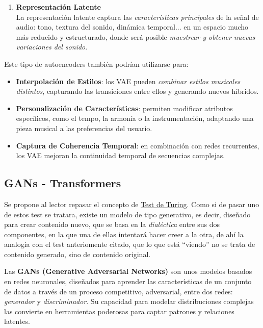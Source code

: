 \begin{enumerate}
    \item \textbf{Representación Latente} \\
    La representación latente captura las \emph{características principales} de la señal de audio: tono, textura del sonido, dinámica temporal... en un espacio mucho más reducido y estructurado, donde será posible \emph{muestrear y obtener nuevas variaciones del sonido}.
\end{enumerate}

Este tipo de autoencoders también podrían utilizarse para:
\begin{itemize}
    \item \textbf{Interpolación de Estilos}: los VAE pueden \emph{combinar estilos musicales distintos}, capturando las transiciones entre ellos y generando nuevos híbridos.
    \item \textbf{Personalización de Características}: permiten modificar atributos específicos, como el tempo, la armonía o la instrumentación, adaptando una pieza musical a las preferencias del usuario.
    \item \textbf{Captura de Coherencia Temporal}: en combinación con redes recurrentes, los VAE mejoran la continuidad temporal de secuencias complejas.
\end{itemize}

\subsection{GANs - Transformers}

Se propone al lector repasar el concepto de \href{https://es.wikipedia.org/wiki/Prueba_de_Turing}{Test de Turing}. Como si de pasar uno de estos test se tratara, existe un modelo de tipo generativo, es decir, diseñado para crear contenido nuevo, que se basa en la \emph{dialéctica} entre sus dos componentes, en la que una de ellas intentará hacer creer a la otra, de ahí la analogía con el test anteriomente citado, que lo que está ``viendo'' no se trata de contenido generado, sino de contenido original.

Las \textbf{GANs (Generative Adversarial Networks)} son unos modelos basados en redes neuronales, diseñados para aprender las características de un conjunto de datos a través de un proceso competitivo, adversarial, entre dos redes: \textit{generador} y \textit{discriminador}. Su capacidad para modelar distribuciones complejas las convierte en herramientas poderosas para captar patrones y relaciones latentes.

